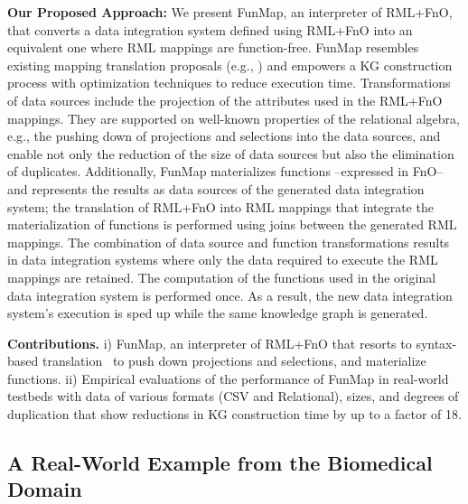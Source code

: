 \noindent \textbf{Our Proposed Approach:} We present FunMap, an interpreter of RML+FnO, that converts a data integration system defined using RML+FnO into an equivalent one where RML mappings are function-free. FunMap resembles existing mapping translation proposals (e.g., \citep{AliW19,corcho2019towards,junior2016funul}) and empowers a KG construction process with optimization techniques to reduce execution time. Transformations of data sources include the projection of the attributes used in the RML+FnO mappings. They are supported on well-known properties of the relational algebra, e.g., the pushing down of projections and selections into the data sources, and enable not only the reduction of the size of data sources but also the elimination of duplicates. Additionally, FunMap materializes functions --expressed in FnO-- and represents the results as data sources of the generated data integration system; the translation of RML+FnO into RML mappings that integrate the materialization of functions is performed using joins between the generated RML mappings. The combination of data source and function transformations results in data integration systems where only the data required to execute the RML mappings are retained. The computation of the functions used in the original data integration system is performed once. As a result, the new data integration system's execution is sped up while the same knowledge graph is generated. 

\noindent\textbf{Contributions.} i) FunMap, an interpreter of RML+FnO that resorts to syntax-based translation~\citep{aho1986compilers} to push down projections and selections, and materialize functions. ii) Empirical evaluations of the performance of FunMap in real-world testbeds with data of various formats (CSV and Relational), sizes, and degrees of duplication that show reductions in KG construction time by up to a factor of 18.

\subsection{A Real-World Example from the Biomedical Domain}

